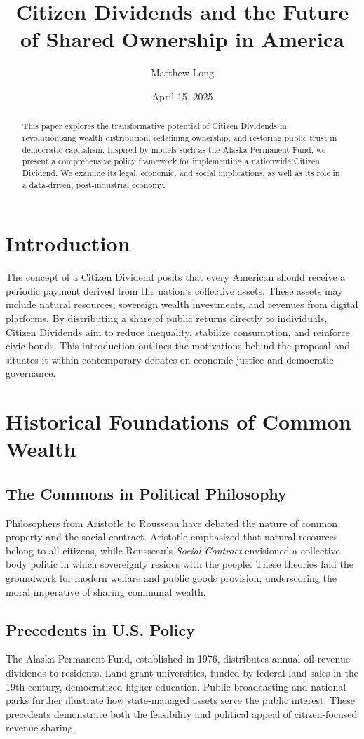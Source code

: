 \documentclass[11pt]{article}
\title{Citizen Dividends and the Future of Shared Ownership in America}
\author{Matthew Long}
\date{April 15, 2025}
\begin{document}
\maketitle

\begin{abstract}
This paper explores the transformative potential of Citizen Dividends in revolutionizing wealth distribution, redefining ownership, and restoring public trust in democratic capitalism. Inspired by models such as the Alaska Permanent Fund, we present a comprehensive policy framework for implementing a nationwide Citizen Dividend. We examine its legal, economic, and social implications, as well as its role in a data-driven, post-industrial economy.
\end{abstract}

\section{Introduction}
The concept of a Citizen Dividend posits that every American should receive a periodic payment derived from the nation’s collective assets. These assets may include natural resources, sovereign wealth investments, and revenues from digital platforms. By distributing a share of public returns directly to individuals, Citizen Dividends aim to reduce inequality, stabilize consumption, and reinforce civic bonds. This introduction outlines the motivations behind the proposal and situates it within contemporary debates on economic justice and democratic governance.

\section{Historical Foundations of Common Wealth}
\subsection{The Commons in Political Philosophy}
Philosophers from Aristotle to Rousseau have debated the nature of common property and the social contract. Aristotle emphasized that natural resources belong to all citizens, while Rousseau’s \textit{Social Contract} envisioned a collective body politic in which sovereignty resides with the people. These theories laid the groundwork for modern welfare and public goods provision, underscoring the moral imperative of sharing communal wealth.

\subsection{Precedents in U.S. Policy}
The Alaska Permanent Fund, established in 1976, distributes annual oil revenue dividends to residents. Land grant universities, funded by federal land sales in the 19th century, democratized higher education. Public broadcasting and national parks further illustrate how state-managed assets serve the public interest. These precedents demonstrate both the feasibility and political appeal of citizen-focused revenue sharing.
\end{document}
